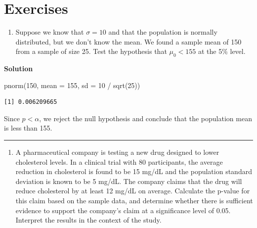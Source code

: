 \documentclass[
  letterpaper,
  DIV=11,
  numbers=noendperiod,
  oneside]{scrreprt}
\newenvironment{Shaded}{\begin{snugshade}}{\end{snugshade}}
\newcommand{\AttributeTok}[1]{\textcolor[rgb]{0.40,0.45,0.13}{#1}}
\newcommand{\DecValTok}[1]{\textcolor[rgb]{0.68,0.00,0.00}{#1}}
\newcommand{\FunctionTok}[1]{\textcolor[rgb]{0.28,0.35,0.67}{#1}}
\newcommand{\NormalTok}[1]{\textcolor[rgb]{0.00,0.23,0.31}{#1}}
\newcommand{\SpecialCharTok}[1]{\textcolor[rgb]{0.37,0.37,0.37}{#1}}
\providecommand{\tightlist}{%
  \setlength{\itemsep}{0pt}\setlength{\parskip}{0pt}}\usepackage{longtable,booktabs,array}
\begin{document}
\hypertarget{exercises-4}{%
\section{Exercises}\label{exercises-4}}

\begin{enumerate}
\def\labelenumi{\arabic{enumi}.}
\tightlist
\item
  Suppose we know that \(\sigma = 10\) and that the population is
  normally distributed, but we don't know the mean. We found a sample
  mean of 150 from a sample of size 25. Test the hypothesis that
  \(\mu_0 < 155\) at the 5\% level.
\end{enumerate}

\textbf{Solution}

\begin{Shaded}
\begin{Highlighting}[]
\FunctionTok{pnorm}\NormalTok{(}\DecValTok{150}\NormalTok{, }\AttributeTok{mean =} \DecValTok{155}\NormalTok{, }\AttributeTok{sd =} \DecValTok{10} \SpecialCharTok{/} \FunctionTok{sqrt}\NormalTok{(}\DecValTok{25}\NormalTok{))}
\end{Highlighting}
\end{Shaded}

\begin{verbatim}
[1] 0.006209665
\end{verbatim}

Since \(p<\alpha\), we reject the null hypothesis and conclude that the
population mean is less than 155.

\begin{center}\rule{0.5\linewidth}{0.5pt}\end{center}

\begin{enumerate}
\def\labelenumi{\arabic{enumi}.}
\setcounter{enumi}{1}
\tightlist
\item
  A pharmaceutical company is testing a new drug designed to lower
  cholesterol levels. In a clinical trial with 80 participants, the
  average reduction in cholesterol is found to be 15 mg/dL and the
  population standard deviation is known to be 5 mg/dL. The company
  claims that the drug will reduce cholesterol by at least 12 mg/dL on
  average. Calculate the p-value for this claim based on the sample
  data, and determine whether there is sufficient evidence to support
  the company's claim at a significance level of 0.05. Interpret the
  results in the context of the study.
\end{enumerate}
\end{document}
